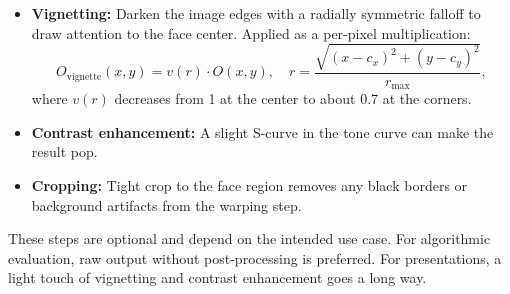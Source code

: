 \begin{itemize}
    \item \textbf{Vignetting:} Darken the image edges with a radially symmetric falloff to draw
          attention to the face center. Applied as a per-pixel multiplication:
          \begin{equation}
              O_{\text{vignette}}(x, y) = v(r) \cdot O(x, y), \quad
              r = \frac{\sqrt{(x - c_x)^2 + (y - c_y)^2}}{r_{\text{max}}},
          \end{equation}
          where $v(r)$ decreases from 1 at the center to about 0.7 at the corners.
    \item \textbf{Contrast enhancement:} A slight S-curve in the tone curve can make the result
          pop.
    \item \textbf{Cropping:} Tight crop to the face region removes any black borders or
          background artifacts from the warping step.
\end{itemize}

These steps are optional and depend on the intended use case. For algorithmic evaluation, raw
output without post-processing is preferred. For presentations, a light touch of vignetting
and contrast enhancement goes a long way.
